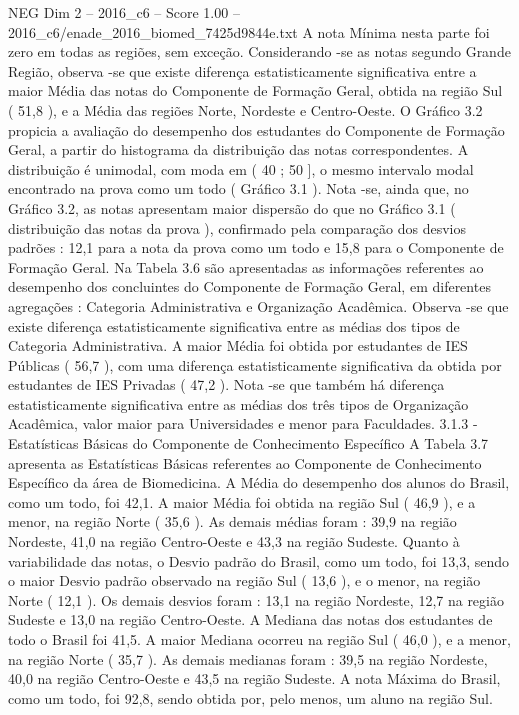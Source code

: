 \begin{textsample}{NEG Dim 2 – 2016\_c6 – Score 1.00 – 2016\_c6/enade\_2016\_biomed\_7425d9844e.txt}
A nota Mínima nesta parte foi zero em todas as regiões, sem exceção.
Considerando -se as notas segundo Grande Região, observa -se que existe diferença estatisticamente significativa entre a maior Média das notas do Componente de Formação Geral, obtida na região Sul ( 51,8 ), e a Média das regiões Norte, Nordeste e Centro-Oeste.
O Gráfico 3.2 propicia a avaliação do desempenho dos estudantes do Componente de Formação Geral, a partir do histograma da distribuição das notas correspondentes.
A distribuição é unimodal, com moda em ( 40 ; 50 ], o mesmo intervalo modal encontrado na prova como um todo ( Gráfico 3.1 ).
Nota -se, ainda que, no Gráfico 3.2, as notas apresentam maior dispersão do que no Gráfico 3.1 ( distribuição das notas da prova ), confirmado pela comparação dos desvios padrões : 12,1 para a nota da prova como um todo e 15,8 para o Componente de Formação Geral.
Na Tabela 3.6 são apresentadas as informações referentes ao desempenho dos concluintes do Componente de Formação Geral, em diferentes agregações : Categoria Administrativa e Organização Acadêmica.
Observa -se que existe diferença estatisticamente significativa entre as médias dos tipos de Categoria Administrativa.
A maior Média foi obtida por estudantes de IES Públicas ( 56,7 ), com uma diferença estatisticamente significativa da obtida por estudantes de IES Privadas ( 47,2 ).
Nota -se que também há diferença estatisticamente significativa entre as médias dos três tipos de Organização Acadêmica, valor maior para Universidades e menor para Faculdades. 3.1.3 - Estatísticas Básicas do Componente de Conhecimento Específico A Tabela 3.7 apresenta as Estatísticas Básicas referentes ao Componente de Conhecimento Específico da área de Biomedicina.
A Média do desempenho dos alunos do Brasil, como um todo, foi 42,1.
A maior Média foi obtida na região Sul ( 46,9 ), e a menor, na região Norte ( 35,6 ).
As demais médias foram : 39,9 na região Nordeste, 41,0 na região Centro-Oeste e 43,3 na região Sudeste.
Quanto à variabilidade das notas, o Desvio padrão do Brasil, como um todo, foi 13,3, sendo o maior Desvio padrão observado na região Sul ( 13,6 ), e o menor, na região Norte ( 12,1 ).
Os demais desvios foram : 13,1 na região Nordeste, 12,7 na região Sudeste e 13,0 na região Centro-Oeste.
A Mediana das notas dos estudantes de todo o Brasil foi 41,5.
A maior Mediana ocorreu na região Sul ( 46,0 ), e a menor, na região Norte ( 35,7 ).
As demais medianas foram : 39,5 na região Nordeste, 40,0 na região Centro-Oeste e 43,5 na região Sudeste.
A nota Máxima do Brasil, como um todo, foi 92,8, sendo obtida por, pelo menos, um aluno na região Sul.

\end{textsample}
